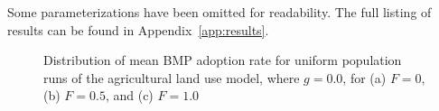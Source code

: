 Some parameterizations have been omitted for readability.
The full listing of results can be found in
Appendix~\ref{app:results}.

\begin{figure}
    \hfill
    \hfill
    \caption{Distribution of mean BMP adoption rate for uniform population
        runs of the agricultural land use model, where $g=0.0$,
        for (a) $F=0$, (b) $F=0.5$, and (c) $F=1.0$}
    \label{fig:farm_res_g00}
\end{figure}

